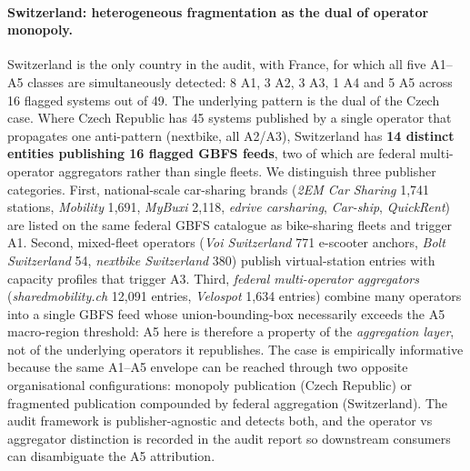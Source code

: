 \documentclass[11pt,a4paper]{article}
\begin{document}
\paragraph{Switzerland: heterogeneous fragmentation as the dual of operator monopoly.}
Switzerland is the only country in the audit, with France, for which
all five A1--A5 classes are simultaneously detected: 8 A1, 3 A2, 3
A3, 1 A4 and 5 A5 across 16 flagged systems out of 49. The
underlying pattern is the dual of the Czech case. Where Czech
Republic has 45 systems published by a single operator that
propagates one anti-pattern (nextbike, all A2/A3), Switzerland has
\textbf{14 distinct entities publishing 16 flagged GBFS feeds},
two of which are federal multi-operator aggregators rather than
single fleets. We distinguish three publisher categories. First,
national-scale car-sharing brands (\emph{2EM Car Sharing}
1{,}741 stations, \emph{Mobility} 1{,}691, \emph{MyBuxi} 2{,}118,
\emph{edrive carsharing}, \emph{Car-ship}, \emph{QuickRent}) are
listed on the same federal GBFS catalogue as bike-sharing fleets
and trigger A1. Second, mixed-fleet operators (\emph{Voi
Switzerland} 771 e-scooter anchors, \emph{Bolt Switzerland} 54,
\emph{nextbike Switzerland} 380) publish virtual-station entries
with capacity profiles that trigger A3. Third, \emph{federal
multi-operator aggregators} (\emph{sharedmobility.ch} 12{,}091
entries, \emph{Velospot} 1{,}634 entries) combine many operators
into a single GBFS feed whose union-bounding-box necessarily
exceeds the A5 macro-region threshold: A5 here is therefore a
property of the \emph{aggregation layer}, not of the underlying
operators it republishes. The case is empirically informative
because the same A1--A5 envelope can be reached through two
opposite organisational configurations: monopoly publication
(Czech Republic) or fragmented publication compounded by federal
aggregation (Switzerland). The audit framework is
publisher-agnostic and detects both, and the operator vs
aggregator distinction is recorded in the audit report so
downstream consumers can disambiguate the A5 attribution.
\end{document}
